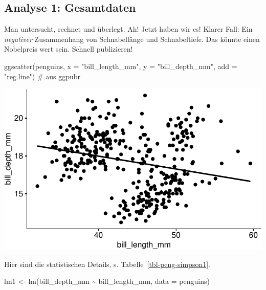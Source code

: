 \documentclass[
  a4paper,
]{scrbook}
\newenvironment{Shaded}{\begin{snugshade}}{\end{snugshade}}
\newcommand{\AttributeTok}[1]{\textcolor[rgb]{0.40,0.45,0.13}{#1}}
\newcommand{\CommentTok}[1]{\textcolor[rgb]{0.37,0.37,0.37}{#1}}
\newcommand{\FunctionTok}[1]{\textcolor[rgb]{0.28,0.35,0.67}{#1}}
\newcommand{\NormalTok}[1]{\textcolor[rgb]{0.00,0.23,0.31}{#1}}
\newcommand{\OtherTok}[1]{\textcolor[rgb]{0.00,0.23,0.31}{#1}}
\newcommand{\SpecialCharTok}[1]{\textcolor[rgb]{0.37,0.37,0.37}{#1}}
\newcommand{\StringTok}[1]{\textcolor[rgb]{0.13,0.47,0.30}{#1}}
\theoremstyle{definition}
\theoremstyle{definition}
\theoremstyle{definition}
\theoremstyle{remark}
\begin{document}
\subsection{Analyse 1: Gesamtdaten}\label{analyse-1-gesamtdaten}

Man untersucht, rechnet und überlegt. Ah! Jetzt haben wir es! Klarer
Fall: Ein \emph{negativer} Zusammenhang von Schnabellänge und
Schnabeltiefe. Das könnte einen Nobelpreis wert sein. Schnell
publizieren!

\begin{Shaded}
\begin{Highlighting}[]
\FunctionTok{ggscatter}\NormalTok{(penguins, }\AttributeTok{x =} \StringTok{"bill\_length\_mm"}\NormalTok{, }\AttributeTok{y =} \StringTok{"bill\_depth\_mm"}\NormalTok{, }
          \AttributeTok{add =} \StringTok{"reg.line"}\NormalTok{)  }\CommentTok{\# aus \textasciigrave{}ggpubr\textasciigrave{}}
\end{Highlighting}
\end{Shaded}

\includegraphics{090-regression2_files/figure-pdf/unnamed-chunk-61-1.pdf}

Hier sind die statistischen Details, s. Tabelle~\ref{tbl-peng-simpson1}.

\begin{Shaded}
\begin{Highlighting}[]
\NormalTok{lm1 }\OtherTok{\textless{}{-}} \FunctionTok{lm}\NormalTok{(bill\_depth\_mm }\SpecialCharTok{\textasciitilde{}}\NormalTok{ bill\_length\_mm, }\AttributeTok{data =}\NormalTok{ penguins)}
\end{Highlighting}
\end{Shaded}
\end{document}
